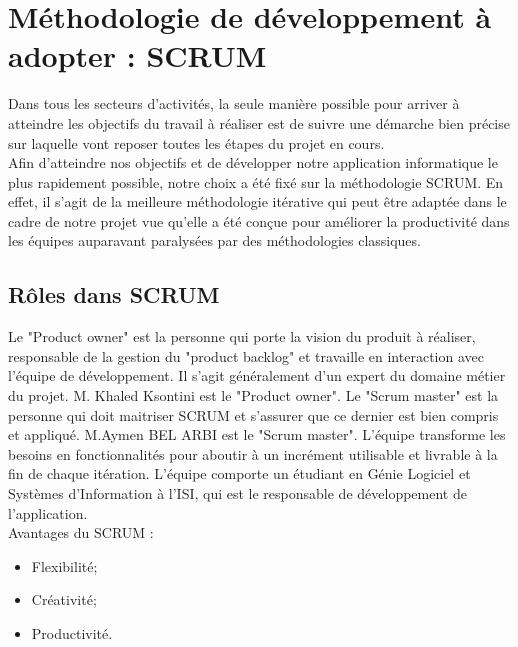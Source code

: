 \section{Méthodologie de développement à adopter : SCRUM}

   
Dans tous les secteurs d’activités, la seule manière possible pour arriver à atteindre les objectifs du travail à réaliser est de suivre une démarche bien précise sur laquelle vont reposer toutes les étapes du projet en cours.\\
Afin d'atteindre nos objectifs et de développer notre application informatique le plus rapidement possible, notre choix a été fixé sur la méthodologie SCRUM. En effet, il s’agit de la meilleure méthodologie itérative qui peut être adaptée dans le cadre de notre projet vue qu'elle a été conçue pour améliorer la productivité dans les équipes auparavant paralysées par des méthodologies classiques.

\subsection{Rôles dans SCRUM}
Le "Product owner" est la personne qui porte la vision du produit à réaliser, responsable de la gestion du "product backlog" et travaille en interaction avec l’équipe de développement. Il s’agit généralement d’un expert du domaine métier du projet. M. Khaled Ksontini est le "Product owner". Le "Scrum master" est la personne qui doit maitriser SCRUM et s’assurer que ce dernier est bien compris et appliqué. M.Aymen BEL ARBI est le "Scrum master". L’équipe transforme les besoins en fonctionnalités pour aboutir à un incrément utilisable et livrable à la fin de chaque itération. L’équipe comporte un étudiant en Génie Logiciel et Systèmes d'Information à l’ISI, qui est le responsable de développement de l'application.\\
Avantages du SCRUM :

 \begin{itemize}
    \item Flexibilité;
    \item Créativité;
    \item Productivité.
    \end{itemize}
    
